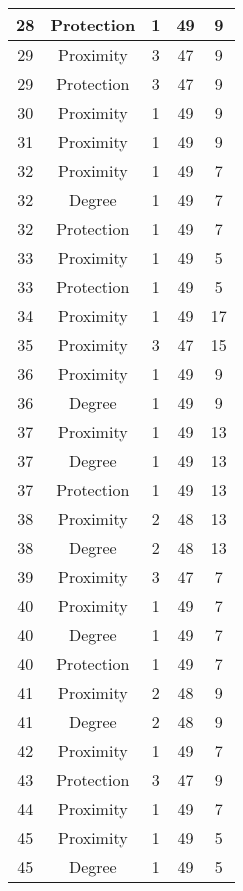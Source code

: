 \documentclass[results.tex]{subfiles}
\begin{document}
\begin{center}
\begin{tabular}{| c || c | c | c | c |}
    \hline
    28 & Protection & 1 & 49 & 9 \\ 
    \hline
    29 & Proximity & 3 & 47 & 9 \\ 
    \hline
    29 & Protection & 3 & 47 & 9 \\ 
    \hline
    30 & Proximity & 1 & 49 & 9 \\ 
    \hline
    31 & Proximity & 1 & 49 & 9 \\ 
    \hline
    32 & Proximity & 1 & 49 & 7 \\ 
    \hline
    32 & Degree & 1 & 49 & 7 \\ 
    \hline
    32 & Protection & 1 & 49 & 7 \\ 
    \hline
    33 & Proximity & 1 & 49 & 5 \\ 
    \hline
    33 & Protection & 1 & 49 & 5 \\ 
    \hline
    34 & Proximity & 1 & 49 & 17 \\ 
    \hline
    35 & Proximity & 3 & 47 & 15 \\ 
    \hline
    36 & Proximity & 1 & 49 & 9 \\ 
    \hline
    36 & Degree & 1 & 49 & 9 \\ 
    \hline
    37 & Proximity & 1 & 49 & 13 \\ 
    \hline
    37 & Degree & 1 & 49 & 13 \\ 
    \hline
    37 & Protection & 1 & 49 & 13 \\ 
    \hline
    38 & Proximity & 2 & 48 & 13 \\ 
    \hline
    38 & Degree & 2 & 48 & 13 \\ 
    \hline
    39 & Proximity & 3 & 47 & 7 \\ 
    \hline
    40 & Proximity & 1 & 49 & 7 \\ 
    \hline
    40 & Degree & 1 & 49 & 7 \\ 
    \hline
    40 & Protection & 1 & 49 & 7 \\ 
    \hline
    41 & Proximity & 2 & 48 & 9 \\ 
    \hline
    41 & Degree & 2 & 48 & 9 \\ 
    \hline
    42 & Proximity & 1 & 49 & 7 \\ 
    \hline
    43 & Protection & 3 & 47 & 9 \\ 
    \hline
    44 & Proximity & 1 & 49 & 7 \\ 
    \hline
    45 & Proximity & 1 & 49 & 5 \\ 
    \hline
    45 & Degree & 1 & 49 & 5 \\ 

\end{tabular}
\end{center}
\end{document}
